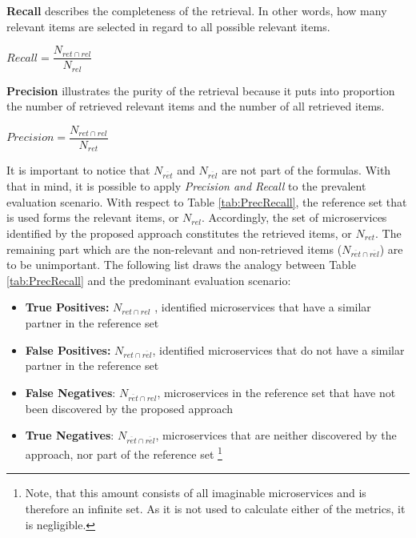 \noindent
\textbf{Recall} describes the completeness of the retrieval. In other words, how many relevant items are selected in regard to all possible relevant items.

\begin{centering}
	\vspace{1cm}
	
	$Recall=\dfrac{N_{ret\cap rel}}{ N_{rel} }  $
	
	\vspace{1cm}
\end{centering} 

\noindent
\textbf{Precision} illustrates the purity of the retrieval because it puts into proportion the number of retrieved relevant items and the number of all retrieved items.

\begin{centering}
	\vspace{1cm}
	
	$Precision=\dfrac{N_{ret\cap rel}}{ N_{ret} }  $
	
	\vspace{1cm}
\end{centering} 

 
\noindent
It is important to notice that $N_{\overline{ret}}$ and $N_{\overline{rel}}$ are not part of the formulas. With that in mind, it is possible to apply \textit{Precision and Recall} to the prevalent evaluation scenario. With respect to Table \ref{tab:PrecRecall}, the reference set that is used forms the relevant items, or $N_{rel}$. Accordingly, the set of microservices identified by the proposed approach constitutes the retrieved items, or $N_{ret}$. The remaining part which are the non-relevant and non-retrieved items ($N_{\overline{ret}\cap \overline{rel}}$) are to be unimportant. The following list draws the analogy between Table \ref{tab:PrecRecall} and the predominant evaluation scenario:
\begin{itemize}
	\item \textbf{True Positives:}  $N_{ret\cap rel}$ , identified microservices that have a similar partner in the reference set
	\item  \textbf{False Positives:}  $N_{ret\cap \overline{rel}}$, identified microservices that do not have a similar partner in the reference set
	\item \textbf{False Negatives}:  $N_{\overline{ret}\cap rel}$, microservices in the reference set that have not been discovered by the proposed approach
	\item \textbf{True Negatives}: $N_{\overline{ret}\cap \overline{rel}}$, microservices that are neither discovered by the approach, nor part of the reference set \footnote{Note, that this amount consists of all imaginable microservices and is therefore an infinite set. As it is not used to calculate either of the metrics, it is negligible. }
	
\end{itemize}

